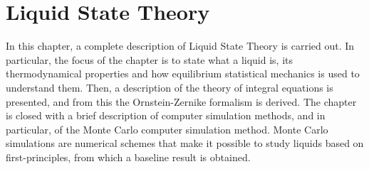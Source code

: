 \chapter{Liquid State Theory}
\label{Cap2}

In this chapter, a complete description of Liquid State
Theory is carried out. In particular, the focus of the chapter is
to state what a liquid is, its thermodynamical properties and
how equilibrium statistical mechanics is used to understand them.
Then, a description of the theory of integral equations is presented,
and from this the Ornstein-Zernike formalism is derived.
The chapter is closed with a brief description of computer simulation
methods, and in particular, of the Monte Carlo computer simulation
method. Monte Carlo simulations are numerical schemes that make it
possible to study liquids based on first-principles, from which
a baseline result is obtained.